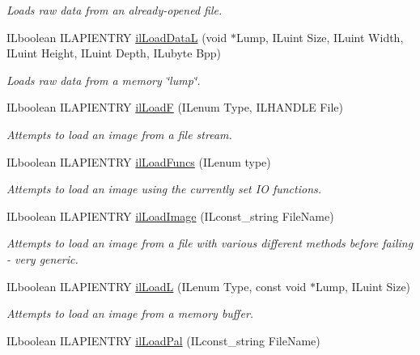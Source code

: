 \begin{DoxyCompactItemize}
\begin{DoxyCompactList}\small\item\em Loads raw data from an already-\/opened file. \end{DoxyCompactList}\item 
\hypertarget{group__file_gacee512181ef7d072d25862eace4fe568}{I\-Lboolean I\-L\-A\-P\-I\-E\-N\-T\-R\-Y \hyperlink{group__file_gacee512181ef7d072d25862eace4fe568}{il\-Load\-Data\-L} (void $\ast$Lump, I\-Luint Size, I\-Luint Width, I\-Luint Height, I\-Luint Depth, I\-Lubyte Bpp)}\label{group__file_gacee512181ef7d072d25862eace4fe568}

\begin{DoxyCompactList}\small\item\em Loads raw data from a memory \char`\"{}lump\char`\"{}. \end{DoxyCompactList}\item 
I\-Lboolean I\-L\-A\-P\-I\-E\-N\-T\-R\-Y \hyperlink{group__file_gaf4026be626ce1e62d6867ccee4afb607}{il\-Load\-F} (I\-Lenum Type, I\-L\-H\-A\-N\-D\-L\-E File)
\begin{DoxyCompactList}\small\item\em Attempts to load an image from a file stream. \end{DoxyCompactList}\item 
I\-Lboolean I\-L\-A\-P\-I\-E\-N\-T\-R\-Y \hyperlink{group__file_ga156c262317e404e53df7454a064973a3}{il\-Load\-Funcs} (I\-Lenum type)
\begin{DoxyCompactList}\small\item\em Attempts to load an image using the currently set I\-O functions. \end{DoxyCompactList}\item 
I\-Lboolean I\-L\-A\-P\-I\-E\-N\-T\-R\-Y \hyperlink{group__file_gace0d235c26455aa9ebe091b0af019a8f}{il\-Load\-Image} (I\-Lconst\-\_\-string File\-Name)
\begin{DoxyCompactList}\small\item\em Attempts to load an image from a file with various different methods before failing -\/ very generic. \end{DoxyCompactList}\item 
I\-Lboolean I\-L\-A\-P\-I\-E\-N\-T\-R\-Y \hyperlink{group__file_ga0417a8c1202ae4720d98b0fe3ecddfda}{il\-Load\-L} (I\-Lenum Type, const void $\ast$Lump, I\-Luint Size)
\begin{DoxyCompactList}\small\item\em Attempts to load an image from a memory buffer. \end{DoxyCompactList}\item 
\hypertarget{group__file_gac412222fcdd3ae96b1d9de01c8e17a5a}{I\-Lboolean I\-L\-A\-P\-I\-E\-N\-T\-R\-Y \hyperlink{group__file_gac412222fcdd3ae96b1d9de01c8e17a5a}{il\-Load\-Pal} (I\-Lconst\-\_\-string File\-Name)}\label{group__file_gac412222fcdd3ae96b1d9de01c8e17a5a}


\end{DoxyCompactItemize}
